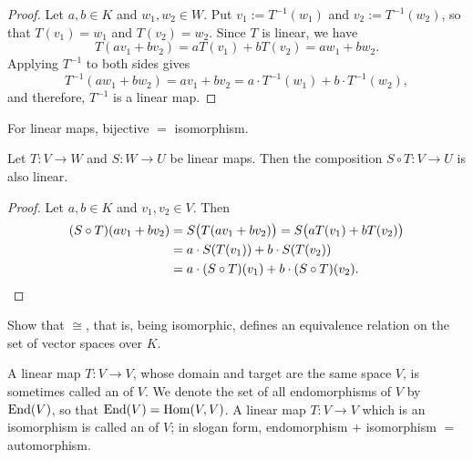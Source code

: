 \begin{proof}
Let $a, b \in K$ and $w_1, w_2 \in W$. Put $v_1 := T^{-1}(w_1)$ and $v_2 := T^{-1}(w_2)$, so that $T(v_1) = w_1$ and $T(v_2) = w_2$. Since $T$ is linear, we have
\[
T(a v_1 + b v_2) = a T(v_1) + b T(v_2) = a w_1 + b w_2.
\]
Applying $T^{-1}$ to both sides gives
\[
T^{-1}(a w_1 + b w_2) = a v_1 + b v_2 = a \cdot T^{-1}(w_1) + b \cdot T^{-1}(w_2),
\]
and therefore, $T^{-1}$ is a linear map.
\end{proof}

\begin{summary}
\label{sum:bijective_equals_iso}
For linear maps, bijective $=$ isomorphism.
\end{summary}

\begin{lemma}
\label{lem:composition_linear}
Let $T: V \to W$ and $S: W \to U$ be linear maps. Then the composition $S \circ T: V \to U$ is also linear.
\end{lemma}

\begin{proof}
Let $a, b \in K$ and $v_1, v_2 \in V$. Then
\begin{align*}
(S \circ T)(a v_1 + b v_2) &= S\big(T(a v_1 + b v_2)\big) = S\big(a T(v_1) + b T(v_2)\big) \\
&= a \cdot S(T(v_1)) + b \cdot S(T(v_2)) \\
&= a \cdot (S \circ T)(v_1) + b \cdot (S \circ T)(v_2). \qedhere
\end{align*}
\end{proof}

\begin{exercise}
\label{exc:iso_equivalence_relation}
Show that $\cong$, that is, being isomorphic, defines an equivalence relation on the set of vector spaces over $K$.
\end{exercise}

\begin{definition}
\label{def:endomorphism}
A linear map $T: V \to V$, whose domain and target are the same space $V$, is sometimes called an  of $V$. We denote the set of all endomorphisms of $V$ by $\operatorname{End}(V)$, so that $\operatorname{End}(V) = \operatorname{Hom}(V, V)$. A linear map $T: V \to V$ which is an isomorphism is called an  of $V$; in slogan form, endomorphism $+$ isomorphism $=$ automorphism.
\end{definition}

